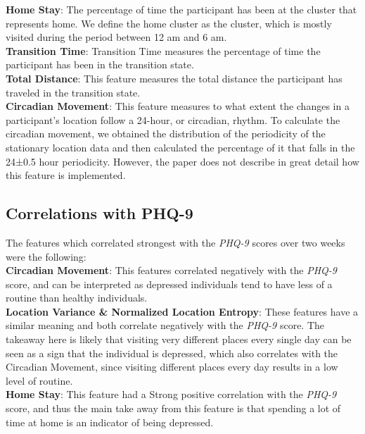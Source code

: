 \textbf{Home Stay}: The percentage of time the participant has been at the cluster that represents home. We define the home cluster as the cluster, which is mostly visited during the period between 12 am and 6 am.\\

\textbf{Transition Time}: Transition Time measures the percentage of time the participant has been in the transition state.\\

\textbf{Total Distance}: This feature measures the total distance the participant has traveled in the transition state.\\

\textbf{Circadian Movement}: This feature measures to what extent the changes in a
participant’s location follow a 24-hour, or circadian, rhythm. To calculate the circadian movement, we obtained the distribution of the periodicity of the stationary location data and then calculated the percentage of it that falls in the 24±0.5 hour periodicity. However, the paper does not describe in great detail how this feature is implemented.\\

\subsection{Correlations with PHQ-9}
The features which correlated strongest with the \textit{PHQ-9} scores over two weeks were the following:\\

\textbf{Circadian Movement}: This features correlated negatively with the \textit{PHQ-9} score, and can be interpreted as depressed individuals tend to have less of a routine than healthy individuals. \\

\textbf{Location Variance \& Normalized Location Entropy}: These features have a similar meaning and both correlate negatively with the \textit{PHQ-9} score. The takeaway here is likely that visiting very different places every single day can be seen as a sign that the individual is depressed, which also correlates with the Circadian Movement, since visiting different places every day results in a low level of routine.\\

\textbf{Home Stay}: This feature had a Strong positive correlation with the \textit{PHQ-9} score, and thus the main take away from this feature is that spending a lot of time at home is an indicator of being depressed.

